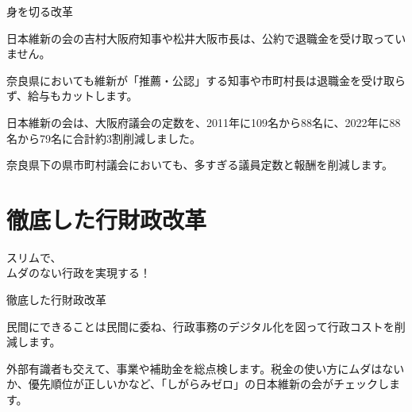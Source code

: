 \documentclass[dvipdfmx]{beamer}
\begin{document}
    \begin{frame}{身を切る改革}{}
        \begin{small}
            \begin{description}
                \setlength{\parsep}{.5mm}
                \setlength{\itemsep}{2mm}
                \item[知事・市町村長の退職金の廃止！と給与のカット！] \mbox{}\par
                日本維新の会の吉村大阪府知事や松井大阪市長は、公約で退職金を受け取っていません。\par
                奈良県においても維新が「推薦・公認」する知事や市町村長は退職金を受け取らず、給与もカットします。
                \item[議員定数・報酬の削減] \mbox{}\par
                日本維新の会は、大阪府議会の定数を、2011年に109名から88名に、2022年に88名から79名に合計約3割削減しました。\par
                奈良県下の県市町村議会においても、多すぎる議員定数と報酬を削減します。
            \end{description}
        \end{small}
    \end{frame}

\section{徹底した行財政改革}
    \begin{frame}{}{}
        \sectionpage
        \begin{center}
            \begin{large}
                \alert{スリムで、}\\\alert{ムダのない行政を実現する！}
            \end{large}
        \end{center}
    \end{frame}

    \begin{frame}{徹底した行財政改革}{}
        \begin{small}
            \begin{description}
                \setlength{\parsep}{.5mm}
                \setlength{\itemsep}{2mm}
                \item[行政のスリム化] \mbox{}\par
                民間にできることは民間に委ね、行政事務のデジタル化を図って行政コストを削減します。
                \item[行政事業レビューの徹底実施] \mbox{}\par
                外部有識者も交えて、事業や補助金を総点検します。税金の使い方にムダはないか、優先順位が正しいかなど、「しがらみゼロ」の日本維新の会がチェックします。
            \end{description}
        \end{small}
    \end{frame}
    
\end{document}
